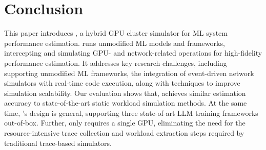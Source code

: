 \section{Conclusion}
This paper introduces \sys, a hybrid GPU cluster simulator for ML system performance estimation. \sys runs unmodified ML models and frameworks, intercepting and simulating GPU- and network-related operations for high-fidelity performance estimation. It addresses key research challenges, including supporting unmodified ML frameworks, the integration of event-driven network simulators with real-time code execution, along with techniques to improve simulation scalability. Our evaluation shows that, \sys achieves similar estimation accuracy to state-of-the-art static workload simulation methods. At the same time, \sys's design is general, supporting three state-of-art LLM training frameworks out-of-box. Further, \sys only requires a single GPU, eliminating the need for the resource-intensive trace collection and workload extraction steps required by traditional trace-based simulators.
